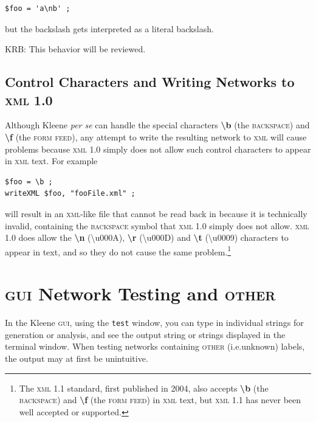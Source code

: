 \documentclass[letterpaper,12pt]{article}
\newcommand{\acro}{\textsc}
\begin{document}
\begin{Verbatim}[fontsize=\small]
$foo = 'a\nb' ;
\end{Verbatim}

\noindent

but the backslash gets interpreted as a literal backslash.  

KRB:  This
behavior will be reviewed.

\subsection{Control Characters and Writing Networks to \acro{xml} 1.0}

Although Kleene \emph{per se} can handle the special characters
\textbf{\textbackslash{}b} (the \acro{backspace}) and
\textbf{\textbackslash{}f} (the \acro{form feed}), any attempt to write
the resulting network to \acro{xml} will cause problems because
\acro{xml} 1.0 simply does not allow such control characters to appear in
\acro{xml} text.  For example

\begin{Verbatim}[fontsize=\small]
$foo = \b ;
writeXML $foo, "fooFile.xml" ;
\end{Verbatim}

\noindent
will result in an \acro{xml}-like file that cannot be read back in
because it is technically invalid, containing the \acro{backspace} symbol
that \acro{xml} 1.0 simply does not allow.  \acro{xml} 1.0 does allow the
\textbf{\textbackslash{}n} (\textbackslash{}u000A),
\textbf{\textbackslash{}r} (\textbackslash{}u000D) and
\textbf{\textbackslash{}t} (\textbackslash{}u0009) characters to appear
in text, and so they do not cause the same problem.\footnote{The
\acro{xml} 1.1 standard, first published in 2004, also accepts
\textbf{\textbackslash{}b} (the \acro{backspace}) and
\textbf{\textbackslash{}f} (the \acro{form feed}) in \acro{xml} text, but
\acro{xml} 1.1 has never been well accepted or supported.}

\newpage

\section{\acro{gui} Network Testing and \acro{other}}

\label{app:test}

In the Kleene \acro{gui}, using the \texttt{test} window, you can type in
individual strings for generation or analysis, and see the output string
or strings displayed in the terminal window.  When testing networks
containing \acro{other} (i.e.\@ unknown) labels, the output may at first
be unintuitive. 
\end{document}

